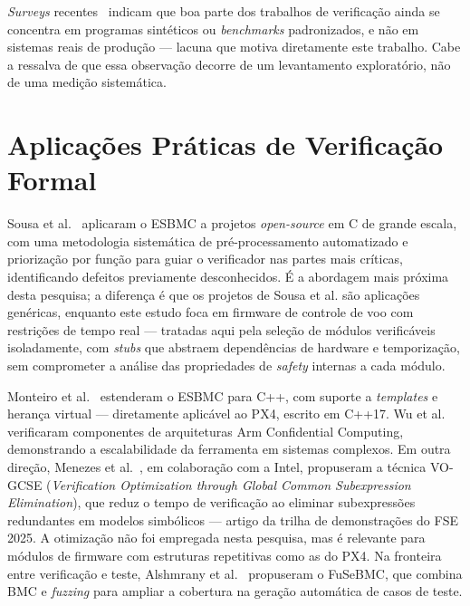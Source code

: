 \textit{Surveys} recentes~\cite{Beyer2022, Beyer2024} indicam que boa parte dos
trabalhos de verificação ainda se concentra em programas sintéticos ou
\textit{benchmarks} padronizados, e não em sistemas reais de produção --- lacuna
que motiva diretamente este trabalho. Cabe a ressalva de que essa observação
decorre de um levantamento exploratório, não de uma medição sistemática.

\section{Aplicações Práticas de Verificação Formal}
\label{sec:rel-praticas}

Sousa et al.~\cite{Sousa2026} aplicaram o ESBMC a projetos \textit{open-source}
em C de grande escala, com uma metodologia sistemática de pré-processamento
automatizado e priorização por função para guiar o verificador nas partes mais
críticas, identificando defeitos previamente desconhecidos. É a abordagem mais
próxima desta pesquisa; a diferença é que os projetos de Sousa et al. são
aplicações genéricas, enquanto este estudo foca em firmware de controle de voo
com restrições de tempo real --- tratadas aqui pela seleção de módulos
verificáveis isoladamente, com \textit{stubs} que abstraem dependências de
hardware e temporização, sem comprometer a análise das propriedades de
\textit{safety} internas a cada módulo.

Monteiro et al.~\cite{Monteiro2022} estenderam o ESBMC para C++, com suporte a
\textit{templates} e herança virtual --- diretamente aplicável ao PX4, escrito em
C++17. Wu et al.~\cite{Wu2024} verificaram componentes de arquiteturas Arm
Confidential Computing, demonstrando a escalabilidade da ferramenta em sistemas
complexos. Em outra direção, Menezes et al.~\cite{Menezes2025GCSE}, em
colaboração com a Intel, propuseram a técnica VO-GCSE (\textit{Verification
Optimization through Global Common Subexpression Elimination}), que reduz o tempo
de verificação ao eliminar subexpressões redundantes em modelos simbólicos ---
artigo da trilha de demonstrações do FSE 2025. A otimização não foi empregada
nesta pesquisa, mas é relevante para módulos de firmware com estruturas
repetitivas como as do PX4. Na fronteira entre verificação e teste, Alshmrany et
al.~\cite{Alshmrany2022} propuseram o FuSeBMC, que combina BMC e \textit{fuzzing}
para ampliar a cobertura na geração automática de casos de teste.

